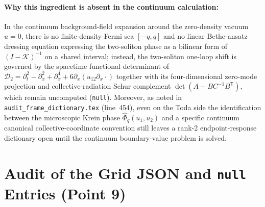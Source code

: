 \documentclass[11pt,a4paper]{article}
\begin{document}
\paragraph{Why this ingredient is absent in the continuum calculation:}
In the continuum background-field expansion around the zero-density vacuum $u=0$, there is no finite-density Fermi sea $[-q,q]$ and no linear Bethe-ansatz dressing equation expressing the two-soliton phase as a bilinear form of $(I-\mathcal{K})^{-1}$ on a shared interval; instead, the two-soliton one-loop shift is governed by the spacetime functional determinant of $\mathcal{D}_2 = \partial_t^2 - \partial_x^2 + \partial_x^4 + 6\partial_x(u_{12}\partial_x\cdot)$ together with its four-dimensional zero-mode projection and collective-radiation Schur complement $\det(A-BC^{-1}B^{\mathsf{T}})$, which remain uncomputed (\texttt{null}). Moreover, as noted in \texttt{audit\_frame\_dictionary.tex} (line~454), even on the Toda side the identification between the microscopic Krein phase $\widehat{\Phi}_q(u_1,u_2)$ and a specific continuum canonical collective-coordinate convention still leaves a rank-2 endpoint-response dictionary open until the continuum boundary-value problem is solved.

\section{Audit of the Grid JSON and \texttt{null} Entries (Point 9)}
\end{document}
